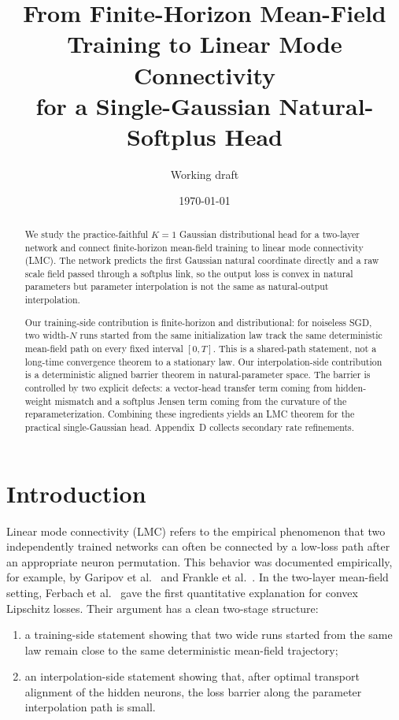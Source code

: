 \documentclass[11pt]{article}
\title{From Finite-Horizon Mean-Field Training to Linear Mode Connectivity\\for a Single-Gaussian Natural-Softplus Head}
\author{Working draft}
\date{\today}
\theoremstyle{definition}
\begin{document}
\maketitle

\begin{abstract}
We study the practice-faithful $K=1$ Gaussian distributional head for a
two-layer network and connect finite-horizon mean-field training to linear mode
connectivity (LMC). The network predicts the first Gaussian natural coordinate
directly and a raw scale field passed through a softplus link, so the output
loss is convex in natural parameters but parameter interpolation is not the
same as natural-output interpolation.

Our training-side contribution is finite-horizon and distributional: for
noiseless SGD, two width-$N$ runs started from the same initialization law
track the same deterministic mean-field path on every fixed interval $[0,T]$.
This is a shared-path statement, not a long-time convergence theorem to a
stationary law. Our interpolation-side contribution is a deterministic aligned
barrier theorem in natural-parameter space. The barrier is controlled by two
explicit defects: a vector-head transfer term coming from hidden-weight mismatch
and a softplus Jensen term coming from the curvature of the reparameterization.
Combining these ingredients yields an LMC theorem for the practical
single-Gaussian head. Appendix~D collects secondary rate refinements.
\end{abstract}

\section{Introduction}

Linear mode connectivity (LMC) refers to the empirical phenomenon that two
independently trained networks can often be connected by a low-loss path after
an appropriate neuron permutation. This behavior was documented empirically,
for example, by Garipov et al.~\cite{Garipov2018} and
Frankle et al.~\cite{Frankle2020}. In the two-layer mean-field setting,
Ferbach et al.~\cite{Ferbach2024} gave the first quantitative explanation for
convex Lipschitz losses. Their argument has a clean two-stage structure:
\begin{enumerate}[label=(\roman*)]
  \item a training-side statement showing that two wide runs started from the
  same law remain close to the same deterministic mean-field trajectory;
  \item an interpolation-side statement showing that, after optimal transport
  alignment of the hidden neurons, the loss barrier along the parameter
  interpolation path is small.
\end{enumerate}
\end{document}
